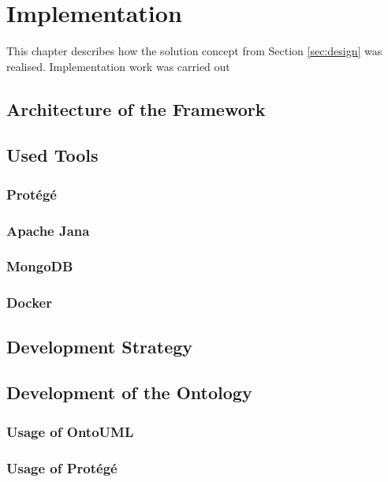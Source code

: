 \section{Implementation\label{sec:implementation}}

This chapter describes how the solution concept from Section \ref{sec:design} was realised.
Implementation work was carried out 


\subsection{Architecture of the Framework}


\subsection{Used Tools}
    \subsubsection{Protégé}
    
    \subsubsection{Apache Jana}
    
    \subsubsection{MongoDB}
    
    \subsubsection{Docker}

    
\subsection{Development Strategy}


\subsection{Development of the Ontology}
    \subsubsection{Usage of OntoUML}
    
    \subsubsection{Usage of Protégé}

